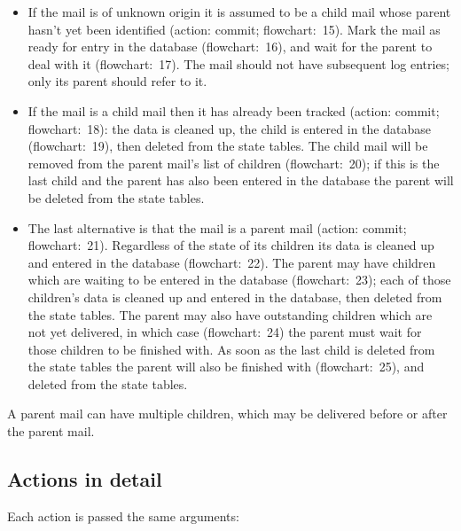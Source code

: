 \documentclass[a4paper,12pt,draft]{article}
\begin{document}
\begin{itemize}

    \item If the mail is of unknown origin it is assumed to be a child mail
        whose parent hasn't yet been identified (action: commit;
        flowchart:~15).  Mark the mail as ready for entry in the database
        (flowchart:~16), and wait for the parent to deal with it
        (flowchart:~17).  The mail should not have subsequent log entries;
        only its parent should refer to it.

    \item If the mail is a child mail then it has already been tracked
        (action: commit; flowchart:~18): the data is cleaned up, the child
        is entered in the database (flowchart:~19), then deleted from the
        state tables.  The child mail will be removed from the parent
        mail's list of children (flowchart:~20); if this is the last child
        and the parent has also been entered in the database the parent
        will be deleted from the state tables.

    \item The last alternative is that the mail is a parent mail (action:
        commit; flowchart:~21).  Regardless of the state of its children
        its data is cleaned up and entered in the database (flowchart:~22).
        The parent may have children which are waiting to be entered in the
        database (flowchart:~23); each of those children's data is cleaned
        up and entered in the database, then deleted from the state tables.
        The parent may also have outstanding children which are not yet
        delivered, in which case (flowchart:~24) the parent must wait for
        those children to be finished with.  As soon as the last child is
        deleted from the state tables the parent will also be finished with
        (flowchart:~25), and deleted from the state tables.

\end{itemize}

A parent mail can have multiple children, which may be delivered before or
after the parent mail.

\subsection{Actions in detail}

\label{actions-in-detail}

Each action is passed the same arguments:
\end{document}
